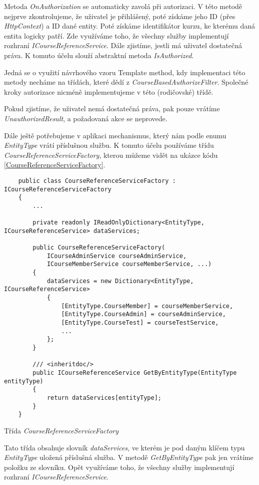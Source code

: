 Metoda \textit{OnAuthorization} se automaticky zavolá při autorizaci. V této metodě nejprve zkontrolujeme, že uživatel je přihlášený, poté získáme jeho ID (přes \textit{HttpContext}) a ID dané entity. Poté získáme identifikátor kurzu, ke kterému daná entita logicky patří. Zde využíváme toho, že všechny služby implementují rozhraní \textit{ICourseReferenceService}. 
Dále zjistíme, jestli má uživatel dostatečná práva. K tomuto účelu slouží abstraktní metoda \textit{IsAuthorized}. 

Jedná se o využití návrhového vzoru Template method, kdy implementaci této metody necháme na třídách, které dědí z \textit{CourseBasedAuthorizeFilter}. 
Společné kroky autorizace nicméně implementujeme v této (rodičovské) třídě.

Pokud zjistíme, že uživatel nemá dostatečná práva, pak pouze vrátíme \textit{UnauthorizedResult}, a požadovaná akce se neprovede.

Dále ještě potřebujeme v aplikaci mechanismus, který nám podle enumu \textit{EntityType} vrátí příslušnou službu. K tomuto účelu používáme třídu \textit{CourseReferenceServiceFactory}, kterou můžeme vidět na ukázce kódu \ref{CourseReferenceServiceFactory}.

\begin{program}
	\begin{lstlisting}
	public class CourseReferenceServiceFactory : ICourseReferenceServiceFactory
	{
		...
		
		private readonly IReadOnlyDictionary<EntityType, ICourseReferenceService> dataServices;
		
		public CourseReferenceServiceFactory(
			ICourseAdminService courseAdminService, 
			ICourseMemberService courseMemberService, ...)
		{
			dataServices = new Dictionary<EntityType, ICourseReferenceService>
			{
				[EntityType.CourseMember] = courseMemberService,
				[EntityType.CourseAdmin] = courseAdminService,
				[EntityType.CourseTest] = courseTestService,
				...
			};
		}
		
		/// <inheritdoc/>
		public ICourseReferenceService GetByEntityType(EntityType entityType)
		{
			return dataServices[entityType];
		}
	}
	\end{lstlisting}
	\caption{Třída \textit{CourseReferenceServiceFactory}}
	\label{CourseReferenceServiceFactory}
\end{program}

Tato třída obsahuje slovník \textit{dataServices}, ve kterém je pod daným klíčem typu \textit{EntityType} uložená příslušná služba.
V metodě \textit{GetByEntityType} pak jen vrátíme položku ze slovníku.
Opět využíváme toho, že všechny služby implementují rozhraní \textit{ICourseReferenceService}.

